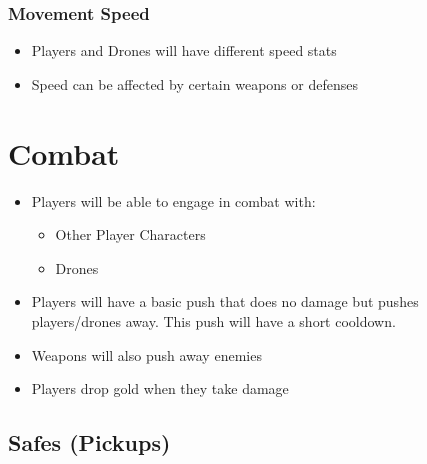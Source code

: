 \documentclass[10pt]{report}
\begin{document}
\subsubsection{Movement Speed}

\begin{itemize}
    \item Players and Drones will have different speed stats
    \item Speed can be affected by certain weapons or defenses
\end{itemize}

\section{Combat}

\begin{itemize}
    \item Players will be able to engage in combat with:
    \begin{itemize}
        \item Other Player Characters
        \item Drones
    \end{itemize}
    \item Players will have a basic push that does no damage but pushes players/drones away. This push will have a short cooldown.
    \item Weapons will also push away enemies
    \item Players drop gold when they take damage
\end{itemize}

\subsection{Safes (Pickups)}
\end{document}
